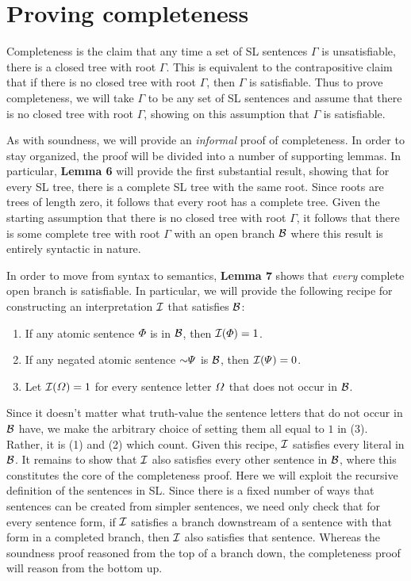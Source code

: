 \section{Proving completeness}
\label{sec.completenessproof}

Completeness is the claim that any time a set of SL sentences $\Gamma$ is unsatisfiable, there is a closed tree with root $\Gamma$.
This is equivalent to the contrapositive claim that if there is no closed tree with root $\Gamma$, then $\Gamma$ is satisfiable.
Thus to prove completeness, we will take $\Gamma$ to be any set of SL sentences and assume that there is no closed tree with root $\Gamma$, showing on this assumption that $\Gamma$ is satisfiable.

As with soundness, we will provide an \emph{informal} proof of completeness.
In order to stay organized, the proof will be divided into a number of supporting lemmas.
In particular, \textbf{Lemma 6} will provide the first substantial result, showing that for every SL tree, there is a complete SL tree with the same root.
Since roots are trees of length zero, it follows that every root has a complete tree.
Given the starting assumption that there is no closed tree with root $\Gamma$, it follows that there is some complete tree with root $\Gamma$ with an open branch $\mathcal{B}$ where this result is entirely syntactic in nature.

In order to move from syntax to semantics, \textbf{Lemma 7} shows that \emph{every} complete open branch is satisfiable.
In particular, we will provide the following recipe for constructing an interpretation $\mathcal{I}$ that satisfies $\mathcal{B}$:

\begin{enumerate}
  \item If any atomic sentence $\varPhi$ is in $\mathcal{B}$, then $\mathcal{I}(\varPhi)=1$.
  \item If any negated atomic sentence $\enot\metaB$ is $\mathcal{B}$, then $\mathcal{I}(\varPsi)=0$.
  \item Let $\mathcal{I}(\varOmega)=1$ for every sentence letter $\varOmega$ that does not occur in $\mathcal{B}$.
\end{enumerate}

Since it doesn't matter what truth-value the sentence letters that do not occur in $\mathcal{B}$ have, we make the arbitrary choice of setting them all equal to $1$ in (3). 
Rather, it is (1) and (2) which count.
Given this recipe, $\mathcal{I}$ satisfies every literal in $\mathcal{B}$.
It remains to show that $\mathcal{I}$ also satisfies every other sentence in $\mathcal{B}$, where this constitutes the core of the completeness proof.
Here we will exploit the recursive definition of the sentences in SL.
Since there is a fixed number of ways that sentences can be created from simpler sentences, we need only check that for every sentence form, if $\mathcal{I}$ satisfies a branch downstream of a sentence with that form in a completed branch, then $\mathcal{I}$ also satisfies that sentence.
Whereas the soundness proof reasoned from the top of a branch down, the completeness proof will reason from the bottom up.

